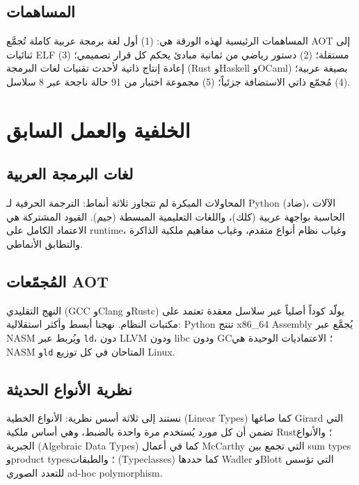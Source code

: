 \documentclass[sigconf]{acmart}
\begin{document}
\subsection{المساهمات}
\label{sec:intro:contributions}

المساهمات الرئيسية لهذه الورقة هي: (1) أول لغة برمجة عربية كاملة تُجمَّع AOT إلى
ثنائيات ELF مستقلة؛ (2) دستور رياضي من ثمانية مبادئ يحكم كل قرار تصميمي؛ (3)
إعادة إنتاج ذاتية لأحدث تقنيات لغات البرمجة (Rust وHaskell وOCaml) بصيغة عربية؛
(4) مُجمّع ذاتي الاستضافة جزئياً؛ (5) مجموعة اختبار من 91 حالة ناجحة عبر 8
سلاسل.

\section{الخلفية والعمل السابق}
\label{sec:background}

\subsection{لغات البرمجة العربية}
\label{sec:background:arabic}

المحاولات المبكرة لم تتجاوز ثلاثة أنماط: الترجمة الحرفية لـ Python (ضاد)،
الآلات الحاسبة بواجهة عربية (كلك)، واللغات التعليمية المبسطة (جيم). القيود
المشتركة هي الاعتماد الكامل على runtime، وغياب نظام أنواع متقدم، وغياب مفاهيم
ملكية الذاكرة والتطابق الأنماطي.

\subsection{المُجمّعات AOT}
\label{sec:background:aot}

النهج التقليدي (GCC وClang وRustc) يولّد كوداً أصلياً عبر سلاسل معقدة تعتمد على
مكتبات النظام. نهجنا أبسط وأكثر استقلالية: Python تنتج x86\_64 Assembly يُجمَّع
عبر NASM ويُربط عبر \texttt{ld}، دون LLVM ودون libc ودون GC؛ الاعتماديات الوحيدة
هي NASM و\texttt{ld} المتاحان في كل توزيع Linux.

\subsection{نظرية الأنواع الحديثة}
\label{sec:background:types}

نستند إلى ثلاثة أسس نظرية: الأنواع الخطية (Linear Types) كما صاغها Girard
\cite{girard1987} التي تضمن أن كل مورد يُستخدم مرة واحدة بالضبط، وهي أساس
ملكية Rust؛ والأنواع الجبرية (Algebraic Data Types) كما في أعمال McCarthy
\cite{mccarthy1963} التي تجمع بين sum types وproduct types؛ والطبقات (Typeclasses)
كما حددها Wadler وBlott \cite{wadler1989} التي تؤسس للتعدد الصوري ad-hoc
polymorphism.
\end{document}

